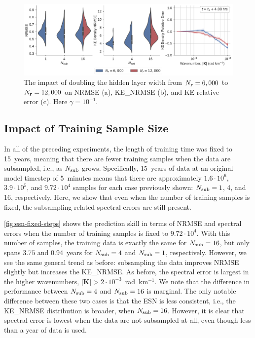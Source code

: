 \begin{figure}
    \centering
    \includegraphics[width=\textwidth]{../figures/rc_reservoir_size.pdf}
    \caption{The impact of doubling the hidden layer width from $N_{\mathbf{r}}=6,000$ to
        $N_{\mathbf{r}}=12,000$ on NRMSE (a), KE\_NRMSE (b), and KE relative error (c).
        Here $\gamma=10^{-1}$.
    }
    \label{fig:esn-size}
\end{figure}

\subsection{Impact of Training Sample Size}
\label{subsec:esn-fixed-steps}

In all of the preceding experiments, the length of training time was fixed to
15~years, meaning that there are fewer training samples when the data are
subsampled, i.e., as $N_\text{sub}$ grows.
Specifically, 15~years of data at an original model timestep of 5~minutes means
that there are approximately
$1.6\cdot10^{6}$, $3.9\cdot10^5$, and $9.72\cdot10^4$ samples
for each case previously shown: $N_\text{sub}=1$, 4, and 16, respectively.
Here, we show that even when the number of training samples is fixed, the
subsampling related spectral errors are still present.

\cref{fig:esn-fixed-steps} shows the prediction skill in terms of NRMSE and
spectral errors when the number of training samples is fixed to $9.72\cdot10^4$.
With this number of samples, the training data is exactly the same for
$N_\text{sub}=16$, but only spans $3.75$ and $0.94$~years for $N_\text{sub}=4$ and $N_\text{sub}=1$,
respectively.
However, we see the same general trend as before: subsampling the data improves
NRMSE slightly but increases the KE\_NRMSE.
As before, the spectral error is largest in the higher wavenumbers,
$|\mathbf{K}| > 2\cdot10^{-3}$~rad~km$^{-1}$.
We note that the difference in performance between $N_\text{sub}=4$ and $N_\text{sub}=16$ is
marginal.
The only notable difference between these two cases is that the ESN is less
consistent, i.e., the KE\_NRMSE distribution is broader, when $N_\text{sub}=16$.
However, it is clear that spectral error is lowest when the data are not
subsampled at all, even though less than a year of data is used.

